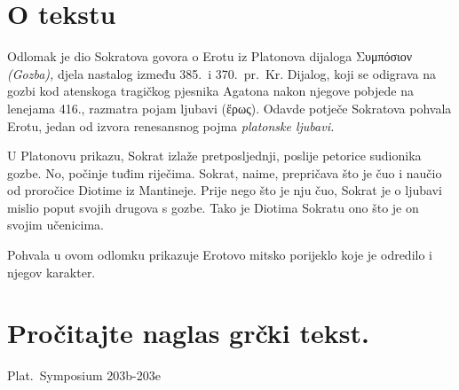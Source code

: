 


\section*{O tekstu}

Odlomak je dio Sokratova govora o Erotu iz Platonova dijaloga \textgreek[variant=ancient]{Συμπόσιον} \textit{(Gozba),} djela nastalog između 385.\ i 370.\ pr.~Kr. Dijalog, koji se odigrava na gozbi kod atenskoga tragičkog pjesnika Agatona nakon njegove pobjede na lenejama 416., razmatra pojam ljubavi \textgreek[variant=ancient]{(ἔρως).} Odavde potječe Sokratova pohvala Erotu, jedan od izvora renesansnog pojma \textit{platonske ljubavi.}

U Platonovu prikazu, Sokrat izlaže pretposljednji, poslije petorice sudionika gozbe. No, počinje tuđim riječima. Sokrat, naime, prepričava što je čuo i naučio od proročice Diotime iz Mantineje. Prije nego što je nju čuo, Sokrat je o ljubavi mislio poput svojih drugova s gozbe. Tako je Diotima Sokratu ono što je on svojim učenicima.

Pohvala u ovom odlomku prikazuje Erotovo mitsko porijeklo koje je odredilo i njegov karakter.



\section*{Pročitajte naglas grčki tekst.}

Plat.\ Symposium 203b-203e


\medskip



